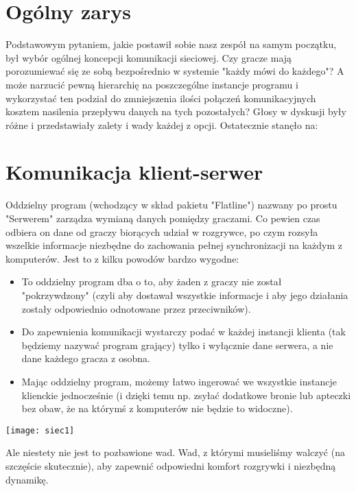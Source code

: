 \documentclass[licencjacka]{pracamgr}
\begin{document}
\section{Ogólny zarys}

Podstawowym pytaniem, jakie postawił sobie nasz zespół na samym początku, był wybór ogólnej koncepcji komunikacji sieciowej. Czy gracze mają porozumiewać się ze sobą bezpośrednio w systemie "każdy mówi do każdego"? A może narzucić pewną hierarchię na poszczególne instancje programu i wykorzystać ten podział do zmniejszenia ilości połączeń komunikacyjnych kosztem nasilenia przepływu danych na tych pozostałych? Głosy w dyskusji były różne i przedstawiały zalety i 
wady każdej z opcji. Ostatecznie stanęło na:

\section{Komunikacja klient-serwer}

Oddzielny program (wchodzący w skład pakietu "Flatline") nazwany po prostu "Serwerem" zarządza wymianą danych pomiędzy graczami. Co pewien czas odbiera on dane od graczy biorących udział w rozgrywce, po czym rozsyła wszelkie informacje niezbędne do zachowania pełnej synchronizacji na każdym z komputerów. Jest to z kilku powodów bardzo wygodne:

\begin{itemize}
    \item To oddzielny program dba o to, aby żaden z graczy nie został "pokrzywdzony" (czyli aby dostawał wszystkie informacje i aby jego działania zostały odpowiednio odnotowane przez przeciwników).
    \item Do zapewnienia komunikacji wystarczy podać w każdej instancji klienta (tak będziemy nazywać program grający) tylko i wyłącznie dane serwera, a nie dane każdego gracza z osobna.
    \item Mając oddzielny program, możemy łatwo ingerować we wszystkie instancje klienckie jednocześnie (i dzięki temu np. zsyłać dodatkowe bronie lub apteczki bez obaw, że na którymś z komputerów nie będzie to widoczne).
\end{itemize}

\begin{center}
\texttt{[image: siec1]}
\end{center}

Ale niestety nie jest to pozbawione wad. Wad, z którymi musieliśmy walczyć (na szczęście skutecznie), aby zapewnić odpowiedni komfort rozgrywki i niezbędną dynamikę.
\end{document}
